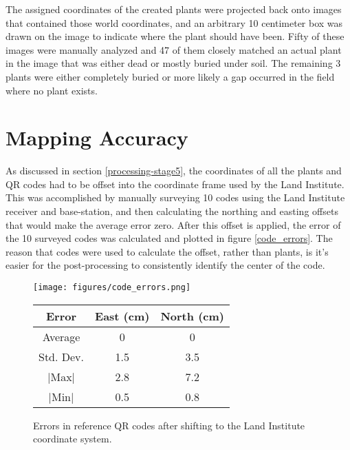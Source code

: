 The assigned coordinates of the created plants were projected back onto images that contained those world coordinates, and an arbitrary 10 centimeter box was drawn on the image to indicate where the plant should have been.  Fifty of these images were manually analyzed and 47 of them closely matched an actual plant in the image that was either dead or mostly buried under soil.  The remaining 3 plants were either completely buried or more likely a gap occurred in the field where no plant exists.  

\section{Mapping Accuracy}

As discussed in section \ref{processing-stage5}, the coordinates of all the plants and QR codes had to be offset into the coordinate frame used by the Land Institute.  This was accomplished by manually surveying 10 codes using the Land Institute receiver and base-station, and then calculating the northing and easting offsets that would make the average error zero.  After this offset is applied, the error of the 10 surveyed codes was calculated and plotted in figure \ref{code_errors}.  The reason that codes were used to calculate the offset, rather than plants, is it's easier for the post-processing to consistently identify the center of the code. 

  \begin{figure}
	\centering
    \texttt{[image: figures/code\_errors.png]}
    \label{figure:code_errors}
    \newline
    \newline
    \centering
    \begin{tabular}[c]{|c|c|c|}
       \hline
        Error & East (cm) & North (cm) \\ 
        \hline
        Average   & 0 & 0             \\
        Std. Dev. & 1.5 & 3.5         \\
        $|$Max$|$   & 2.8 & 7.2       \\
        $|$Min$|$   & 0.5 & 0.8       \\
        \hline
    \end{tabular}
    \captionsetup{labelformat=andtable}
    \caption{Errors in reference QR codes after shifting to the Land Institute coordinate system.}
  \end{figure}

